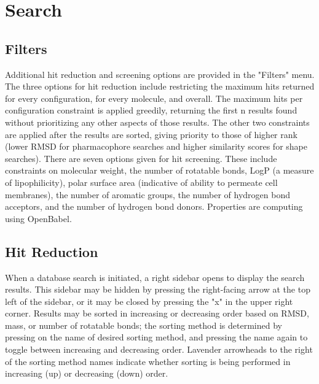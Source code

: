 \section{Search}

\subsection{Filters}
Additional hit reduction and screening options are provided in the "Filters" menu. The three options for hit reduction include restricting the maximum hits returned for every configuration, for every molecule, and overall. The maximum hits per configuration constraint is applied greedily, returning the first n results found without prioritizing any other aspects of those results. The other two constraints are applied after the results are sorted, giving priority to those of higher rank (lower RMSD for pharmacophore searches and higher similarity scores for shape searches). There are seven options given for hit screening. These include constraints on molecular weight, the number of rotatable bonds, LogP (a measure of lipophilicity), polar surface area (indicative of ability to permeate cell membranes), the number of aromatic groups, the number of hydrogen bond acceptors, and the number of hydrogen bond donors. Properties are computing using OpenBabel. 

\subsection{Hit Reduction}

When a database search is initiated, a right sidebar opens to display the search results. This sidebar may be hidden by pressing the right-facing arrow at the top left of the sidebar, or it may be closed by pressing the "x" in the upper right corner. Results may be sorted in increasing or decreasing order based on RMSD, mass, or number of rotatable bonds; the sorting method is determined by pressing on the name of desired sorting method, and pressing the name again to toggle between increasing and decreasing order. Lavender arrowheads to the right of the sorting method names indicate whether sorting is being performed in increasing (up) or decreasing (down) order. 